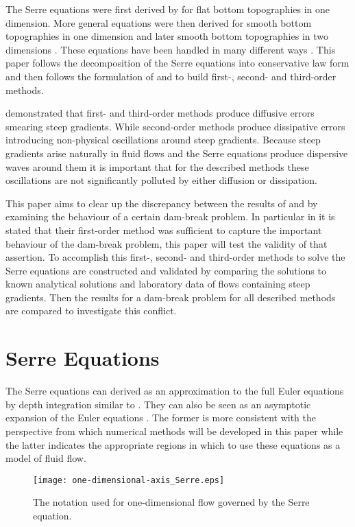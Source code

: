\documentclass[SingleSpace,12pt,Proceedings]{Serre_ASCE}
\begin{document}
The Serre equations were first derived by  for flat bottom topographies in one dimension. More general equations were then derived for smooth bottom topographies in one dimension \cite{Su-Gardener-1969-536} and later smooth bottom topographies in two dimensions \cite{Green-Naghdi-1976-237}. These equations have been handled in many different ways \cite{Dutykh-2014-315,Bonneton-etal-2011-1479,Antunes-do-Carmo-etal-1993-725,Chazel-etal-2011-105,Barthelemy-2006-51-1217,Barthelemy-2007-53-1423,Clamond-2011-315}. This paper follows the decomposition of the Serre equations into conservative law form \cite{Hank-etal-2010-2034,Guyenne-etal-2014-169} and then follows the formulation of  and  to build first-, second- and third-order methods.

 demonstrated that first- and third-order methods produce diffusive errors smearing steep gradients. While second-order methods produce dissipative errors introducing non-physical oscillations around steep gradients. Because steep gradients arise naturally in fluid flows and the Serre equations produce dispersive waves around them \cite{El-etal-2006} it is important that for the described methods these oscillations are not significantly polluted by either diffusion or dissipation.

This paper aims to clear up the discrepancy between the results of  and  by examining the behaviour of a certain dam-break problem. In particular in  it is stated that their first-order method was sufficient to capture the important behaviour of the dam-break problem, this paper will test the validity of that assertion. To accomplish this first-, second- and third-order methods to solve the Serre equations are constructed and validated by comparing the solutions to known analytical solutions and laboratory data of flows containing steep gradients. Then the results for a dam-break problem for all described methods are compared to investigate this conflict. 

\section{Serre Equations}
\label{section:Serre Equations}
The Serre equations can derived as an approximation to the full Euler equations by depth integration similar to . They can also be seen as an asymptotic expansion of the Euler equations \cite{Bonneton-Lannes-2009-16601}. The former is more consistent with the perspective from which numerical methods will be developed in this paper while the latter indicates the appropriate regions in which to use these equations as a model of fluid flow.
\begin{figure}
\begin{center}
\texttt{[image: one-dimensional-axis\_Serre.eps]}
\end{center}
\caption{The notation used for one-dimensional flow governed by the Serre equation.}
\label{fig:Notation}
\end{figure}
\end{document}
